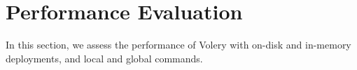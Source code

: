 \documentclass[10pt, conference, compsocconf, letterpaper]{IEEEtranv17}
\begin{document}
%
%



\section{Performance Evaluation}
\label{sec:evaluation}


In this section, we assess the performance of Volery with on-disk and in-memory deployments, and local and global commands.
\end{document}
